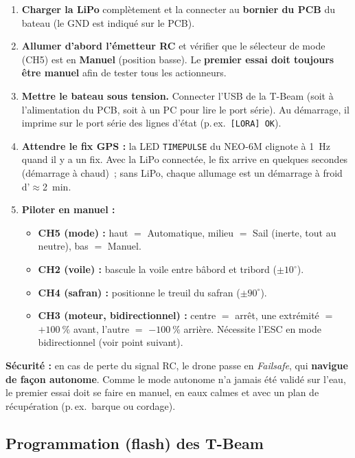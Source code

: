 \documentclass[12pt,a4paper]{article}
\begin{document}
\begin{enumerate}
  \item \textbf{Charger la LiPo} compl\`etement et la connecter au \textbf{bornier du
    PCB} du bateau (le GND est indiqu\'e sur le PCB).
  \item \textbf{Allumer d'abord l'\'emetteur RC} et v\'erifier que le s\'electeur de
    mode (CH5) est en \textbf{Manuel} (position basse). Le \textbf{premier essai doit
    toujours \^etre manuel} afin de tester tous les actionneurs.
  \item \textbf{Mettre le bateau sous tension.} Connecter l'USB de la T-Beam (soit à
    l'alimentation du PCB, soit à un PC pour lire le port s\'erie). Au d\'emarrage, il
    imprime sur le port s\'erie des lignes d'\'etat (p.\,ex.\ \texttt{[LORA] OK}).
  \item \textbf{Attendre le fix GPS :} la LED \texttt{TIMEPULSE} du NEO-6M clignote à
    1~Hz quand il y a un fix. Avec la LiPo connect\'ee, le fix arrive en quelques
    secondes (d\'emarrage à chaud)~; sans LiPo, chaque allumage est un d\'emarrage à
    froid d'$\approx$2~min.
  \item \textbf{Piloter en manuel :}
  \begin{itemize}
    \item \textbf{CH5 (mode) :} haut $=$ Automatique, milieu $=$ Sail (inerte, tout
      au neutre), bas $=$ Manuel.
    \item \textbf{CH2 (voile) :} bascule la voile entre b\^abord et tribord ($\pm10^{\circ}$).
    \item \textbf{CH4 (safran) :} positionne le treuil du safran ($\pm90^{\circ}$).
    \item \textbf{CH3 (moteur, bidirectionnel) :} centre $=$ arr\^et, une extr\'emit\'e
      $=$ $+100~\%$ avant, l'autre $=$ $-100~\%$ arri\`ere. N\'ecessite l'ESC en mode
      bidirectionnel (voir point suivant).
  \end{itemize}
\end{enumerate}

\begin{warningbox}
  \textbf{S\'ecurit\'e :} en cas de perte du signal RC, le drone passe en
  \emph{Failsafe}, qui \textbf{navigue de fa\c{c}on autonome}. Comme le mode autonome
  n'a jamais \'et\'e valid\'e sur l'eau, le premier essai doit se faire en manuel, en
  eaux calmes et avec un plan de r\'ecup\'eration (p.\,ex.\ barque ou cordage).
\end{warningbox}

\subsection{Programmation (flash) des T-Beam}
\end{document}
